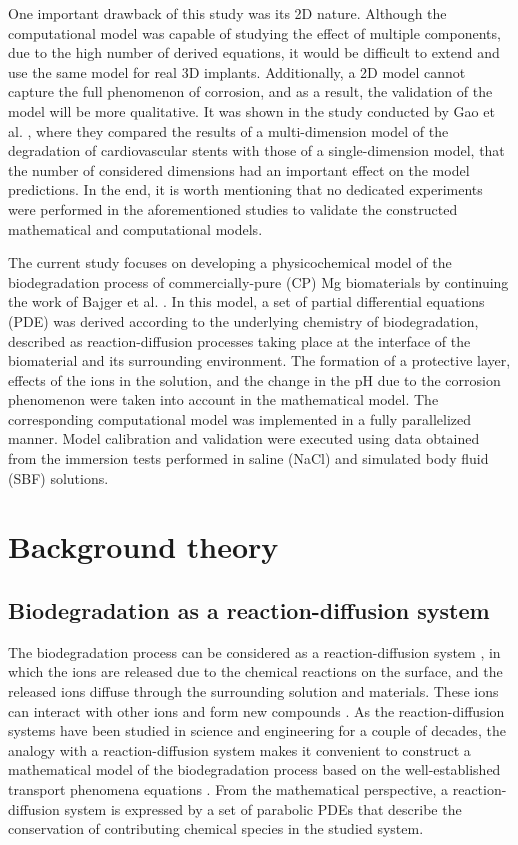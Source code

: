 One important drawback of this study was its 2D nature. Although the computational model was capable of studying the effect of multiple components, due to the high number of derived equations, it would be difficult to extend and use the same model for real 3D implants. Additionally, a 2D model cannot capture the full phenomenon of corrosion, and as a result, the validation of the model will be more qualitative. It was shown in the study conducted by Gao et al. \cite{Gao2018}, where they compared the results of a multi-dimension model of the degradation of cardiovascular stents with those of a single-dimension model, that the number of considered dimensions had an important effect on the model predictions. In the end, it is worth mentioning that no dedicated experiments were performed in the aforementioned studies to validate the constructed mathematical and computational models.


The current study focuses on developing a physicochemical model of the biodegradation process of commercially-pure (CP) Mg biomaterials by continuing the work of Bajger et al. \cite{Bajger2016}. In this model, a set of partial differential equations (PDE) was derived according to the underlying chemistry of biodegradation, described as reaction-diffusion processes taking place at the interface of the biomaterial and its surrounding environment. The formation of a protective layer, effects of the ions in the solution, and the change in the pH due to the corrosion phenomenon were taken into account in the mathematical model. The corresponding computational model was  implemented in a fully parallelized manner. Model calibration and validation were executed using data obtained from the immersion tests performed in saline (NaCl) and simulated body fluid (SBF) solutions.

\section{Background theory}

\subsection{Biodegradation as a reaction-diffusion system}

The biodegradation process can be considered as a reaction-diffusion system \cite{wang2008}, in which the ions are released due to the chemical reactions on the surface, and the released ions diffuse through the surrounding solution and materials. These ions can interact with other ions and form new compounds \cite{Mei2020}. As the reaction-diffusion systems have been studied in science and engineering for a couple of decades, the analogy with a reaction-diffusion system makes it convenient to construct a mathematical model of the biodegradation process based on the well-established transport phenomena equations \cite{Grindrod1996}. From the mathematical perspective, a reaction-diffusion system is expressed by a set of parabolic PDEs that describe the conservation of contributing chemical species in the studied system.


